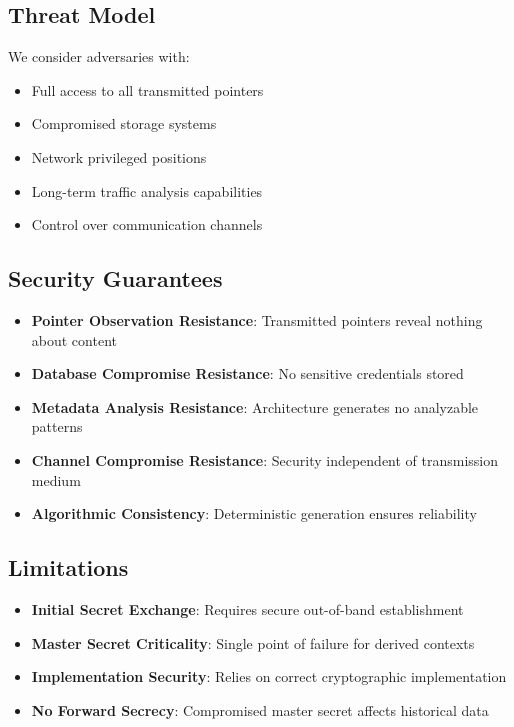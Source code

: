 \documentclass[11pt,a4paper]{article}
\begin{document}
\subsection{Threat Model}

We consider adversaries with:
\begin{itemize}
\item Full access to all transmitted pointers
\item Compromised storage systems
\item Network privileged positions
\item Long-term traffic analysis capabilities
\item Control over communication channels
\end{itemize}

\subsection{Security Guarantees}

\begin{itemize}
\item \textbf{Pointer Observation Resistance}: Transmitted pointers reveal nothing about content
\item \textbf{Database Compromise Resistance}: No sensitive credentials stored
\item \textbf{Metadata Analysis Resistance}: Architecture generates no analyzable patterns
\item \textbf{Channel Compromise Resistance}: Security independent of transmission medium
\item \textbf{Algorithmic Consistency}: Deterministic generation ensures reliability
\end{itemize}

\subsection{Limitations}

\begin{itemize}
\item \textbf{Initial Secret Exchange}: Requires secure out-of-band establishment
\item \textbf{Master Secret Criticality}: Single point of failure for derived contexts
\item \textbf{Implementation Security}: Relies on correct cryptographic implementation
\item \textbf{No Forward Secrecy}: Compromised master secret affects historical data
\end{itemize}
\end{document}
